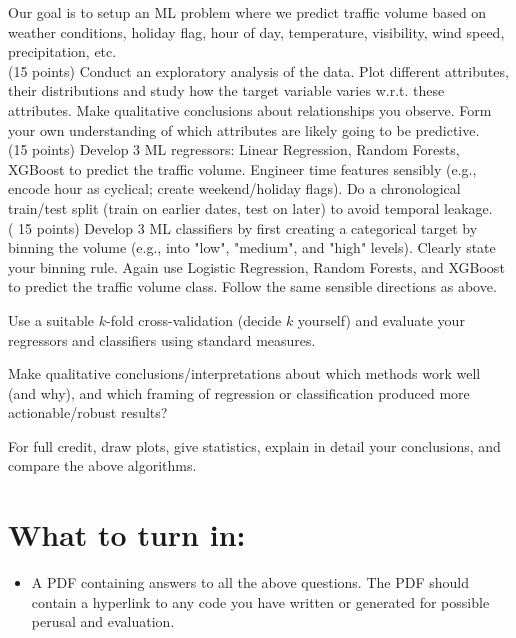 \documentclass[10pt]{article}
\begin{document}
Our goal is to setup an ML problem where we predict traffic volume based on weather conditions, holiday flag, hour of day, temperature, visibility, wind speed, precipitation, etc.\\
(15 points) Conduct an exploratory analysis of the data. Plot different attributes, their distributions and study how the target variable varies w.r.t. these attributes. Make qualitative conclusions about relationships you observe. Form your own understanding of which attributes are likely going to be predictive.\\
(15 points) Develop 3 ML regressors: Linear Regression, Random Forests, XGBoost to predict the traffic volume. Engineer time features sensibly (e.g., encode hour as cyclical; create weekend/holiday flags). Do a chronological train/test split (train on earlier dates, test on later) to avoid temporal leakage.\\
( 15 points) Develop 3 ML classifiers by first creating a categorical target by binning the volume (e.g., into "low", "medium", and "high" levels). Clearly state your binning rule. Again use Logistic Regression, Random Forests, and XGBoost to predict the traffic volume class. Follow the same sensible directions as above.

Use a suitable $k$-fold cross-validation (decide $k$ yourself) and evaluate your regressors and classifiers using standard measures.

Make qualitative conclusions/interpretations about which methods work well (and why), and which framing of regression or classification produced more actionable/robust results?

For full credit, draw plots, give statistics, explain in detail your conclusions, and compare the above algorithms.

\section*{What to turn in:}
\begin{itemize}
  \item A PDF containing answers to all the above questions. The PDF should contain a hyperlink to any code you have written or generated for possible perusal and evaluation.
\end{itemize}
\end{document}
